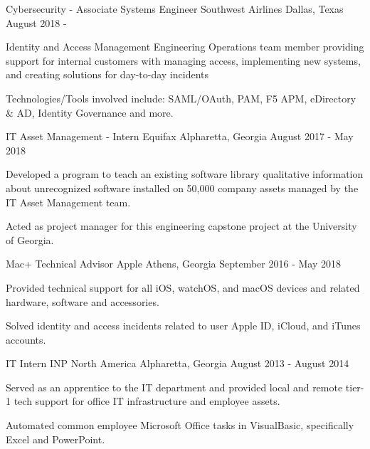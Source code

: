 \begin{cventries}
  \cventry
    {Cybersecurity - Associate Systems Engineer}
    {Southwest Airlines}
    {Dallas, Texas}
    {August 2018 - }
    {
      \begin{cvitems}
        \item {Identity and Access Management Engineering Operations team member providing support for internal customers with managing access, implementing new systems, and creating solutions for day-to-day incidents}
        \item {Technologies/Tools involved include: SAML/OAuth, PAM, F5 APM, eDirectory \& AD, Identity Governance and more.}
      \end{cvitems}
    }
  \cventry
    {IT Asset Management - Intern}
    {Equifax}
    {Alpharetta, Georgia}
    {August 2017 - May 2018}
    {
      \begin{cvitems}
        \item {Developed a program to teach an existing software library qualitative information about unrecognized software installed on 50,000 company assets managed by the IT Asset Management team.}
        \item {Acted as project manager for this engineering capstone project at the University of Georgia.}
      \end{cvitems}
    }
  \cventry
    {Mac+ Technical Advisor}
    {Apple}
    {Athens, Georgia}
    {September 2016 - May 2018}
    {
      \begin{cvitems}
        \item {Provided technical support for all iOS, watchOS, and macOS devices and related hardware, software and accessories.}
        \item {Solved identity and access incidents related to user Apple ID, iCloud, and iTunes accounts.}
      \end{cvitems}
    }
  \cventry
    {IT Intern}
    {INP North America}
    {Alpharetta, Georgia}
    {August 2013 - August 2014}
    {
      \begin{cvitems}
        \item Served as an apprentice to the IT department and provided local and remote tier-1 tech support for office IT infrastructure and employee assets.
        \item Automated common employee Microsoft Office tasks in VisualBasic, specifically Excel and PowerPoint.
      \end{cvitems}
    }
\end{cventries}
